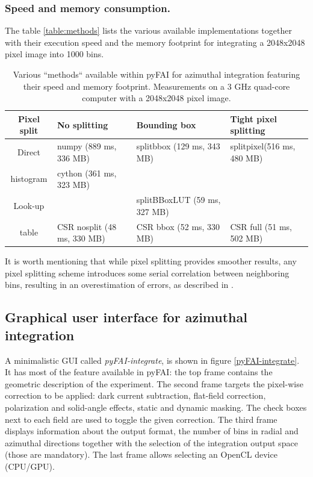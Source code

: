 \documentclass[preprint]{iucr}
\begin{document}
\subsubsection{Speed and memory consumption.}

The table \ref{table:methods}  lists the various available implementations
together with their execution speed and the memory footprint for integrating a 2048x2048
pixel image into 1000 bins.

\begin{table}
\label{table_methods}
\caption{Various ``methods`` available within pyFAI for azimuthal integration
featuring their speed and memory footprint. Measurements on a 3 GHz quad-core
computer with a 2048x2048 pixel image.}
\begin{tabular}[pos]{|c|l|l|l|}
\hline
Pixel split& No splitting & Bounding box & Tight pixel splitting \\
\hline
Direct    & numpy (889 ms, 336 MB) & splitbbox (129 ms, 343 MB) &
splitpixel(516 ms, 480 MB)\\
histogram & cython (361 ms, 323 MB) &                       &                \\
\hline
Look-up   &       & splitBBoxLUT (59 ms, 327 MB) &    \\
table     & CSR nosplit (48 ms, 330 MB)       & CSR bbox (52 ms, 330
MB) & CSR full (51 ms, 502 MB)\\
\hline
\end{tabular}
\end{table}

It is worth mentioning that while pixel splitting provides smoother results, any
pixel splitting scheme introduces some serial correlation between
neighboring bins, resulting in an overestimation of errors, as described in
\cite{billinge2014}.

\subsection{Graphical user interface for azimuthal integration}

A minimalistic GUI called \textit{pyFAI-integrate}, is
shown in figure \ref{pyFAI-integrate}.
It has most of the feature available in pyFAI:
the top frame contains the geometric description of the experiment.
The second frame targets the pixel-wise correction to be applied: dark current
subtraction, flat-field correction, polarization and solid-angle effects, static and dynamic
masking. The check boxes next to each field are used to toggle the given correction.
The third frame displays information about the output format, the
number of bins in radial and azimuthal directions together with the
selection of the integration output space (those are mandatory).
The last frame allows selecting an OpenCL device (CPU/GPU).
\end{document}
